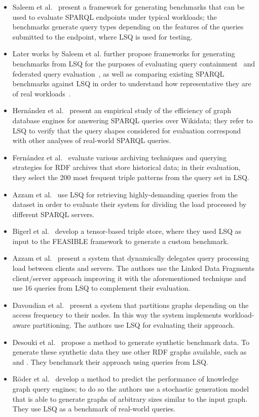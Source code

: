 \begin{itemize}
\item Saleem et al.~\cite{SaleemMN15} present a framework for generating benchmarks that can be used to evaluate SPARQL endpoints under typical workloads; the benchmarks generate query types depending on the features of the queries submitted to the endpoint, where LSQ is used for testing. 
\item Later works by Saleem et al. further propose frameworks for generating benchmarks from LSQ for the purposes of evaluating query containment~\cite{SaleemMSLN18,saleem2017sqcframework} and federated query evaluation~\cite{saleem2018largerdfbench}, as well as comparing existing SPARQL benchmarks against LSQ in order to understand how representative they are of real workloads~\cite{SaleemSCBMN19}. 
\item Hern{\'a}ndez et al.~\cite{hernandez2016querying} present an empirical study of the efficiency of graph database engines for answering SPARQL queries over Wikidata; they refer to LSQ to verify that the query shapes considered for evaluation correspond with other analyses of real-world SPARQL queries. 
\item Fern{\'a}ndez et al.~\cite{fernandez2019evaluating} evaluate various archiving techniques and querying strategies for RDF archives that store historical data; in their evaluation, they select the 200 most frequent triple patterns from the \dbpedia query set in LSQ. 
\item Azzam et al.~\cite{azzam2020smart} use LSQ for retrieving highly-demanding queries from the dataset in order to evaluate their system for dividing the load processed by different SPARQL servers. 
\item Bigerl et al.~\cite{bigerl2020tentris} develop a tensor-based triple store, where they used LSQ as input to the FEASIBLE framework to generate a custom benchmark. 
\item Azzam et al.~\cite{AzzamAMKPH21} present a system that dynamically delegates query processing load between clients and servers. The authors use the Linked Data Fragments client/server approach improving it with the aforementioned technique and use 16 queries from LSQ to complement their evaluation.
\item Davoudian et al.~\cite{davoudian2021workload} present a system that partitions graphs depending on the access frequency to their nodes. In this way the system implements workload-aware partitioning. The authors use LSQ for evaluating their approach.
\item Desouki et al.~\cite{9364498} propose a method to generate synthetic benchmark data. To generate these synthetic data they use other RDF graphs available, such as \swdf and . They benchmark their approach using queries from LSQ.
\item R\"oder et al.~\cite{9364380} develop a method to predict the performance of knowledge graph query engines; to do so the authors use a stochastic generation model that is able to generate graphs of arbitrary sizes similar to the input graph. They use LSQ as a benchmark of real-world queries.
\end{itemize}

